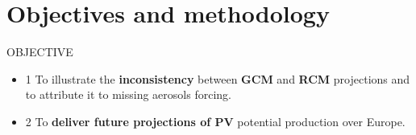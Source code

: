 \documentclass{beamer}%
\begin{document}
\section{Objectives and methodology}

\begin{frame}[fragile]{OBJECTIVE}
  \begin{itemize}
  \item {\Huge{\alert{1}}} To illustrate the \textbf{inconsistency} between \textbf{GCM} and \textbf{RCM} projections and to attribute it to missing aerosols forcing. 
    \vspace{1.5\baselineskip}
    \item {\Huge{\alert{2}}} To \textbf{deliver future projections of PV} potential production over Europe.
    \end{itemize}
\end{frame}
\end{document}
